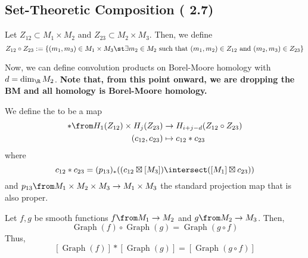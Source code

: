 \subsection{Set-Theoretic Composition (\cite{cg} 2.7)}
\begin{defn}
  Let \(Z_{12} \subset M_1 \times M_2\) and \(Z_{23} \subset M_2
  \times M_3\). Then, we define \[
    Z_{12} \circ Z_{23} := \{(m_1,m_3) \in M_1 \times M_3 \st \exists
    m_2 \in M_2 \text{ such that } (m_1, m_2) \in Z_{12} \text{ and }
    (m_2, m_3) \in Z_{23}\}
  \]
\end{defn}
Now, we can define convolution products on Borel-Moore homology with
\(d = \dim_\R M_2\). \textbf{Note that, from this point onward, we are
  dropping the BM and all homology is Borel-Moore homology.}
\begin{defn}
  We define the  to be a map
  \begin{align*}
    * \from H_1(Z_{12}) \times H_j(Z_{23}) & \to H_{i+j-d}(Z_{12} \circ
                                             Z_{23}) \\
    (c_{12}, c_{23}) & \mapsto c_{12} * c_{23}
  \end{align*}
  where \[
    c_{12} * c_{23} = (p_{13})_*((c_{12} \boxtimes [M_3]) \intersect
    ([M_1] \boxtimes c_{23}))
  \]
  and \(p_{13} \from M_1 \times M_2 \times M_3 \to M_1 \times M_3\)
  the standard projection map that is also proper.
\end{defn}
\begin{example}
  Let \(f,g\) be smooth functions \(f \from M_1 \to M_2\) and \(g
  \from M_2 \to M_3\). Then, \[
    \operatorname{Graph}(f) \circ \operatorname{Graph}(g) =
    \operatorname{Graph}(g \circ f)
  \]
  Thus, \[
   [\operatorname{Graph}(f)] * [\operatorname{Graph}(g)] =
    [\operatorname{Graph}(g \circ f)]
  \]
\end{example}
